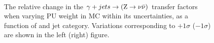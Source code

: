 \begin{figure}[!h]
  \centering
   ~~
  \\

  \caption{\label{fig:tfSyst_pu_gjToZinv} The relative change in the
  $\gj \rightarrow (\znunu)$ transfer
  factors when varying PU weight in MC within its uncertainties, as a function of \scalht and jet category. 
  Variations corresponding to $+1\sigma$ ($-1\sigma$) are shown in the left (right) figure. 
  }
\end{figure}

